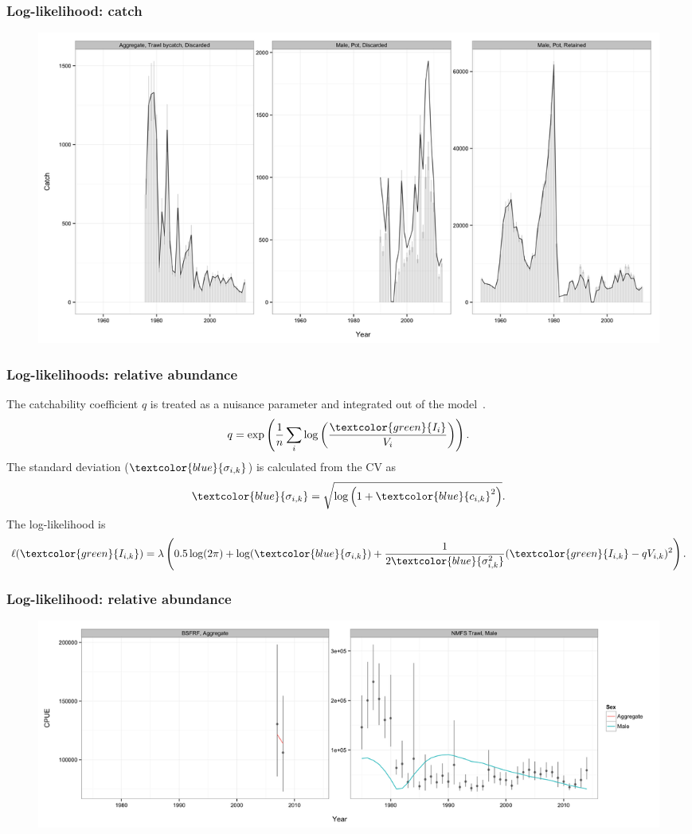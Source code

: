 \documentclass{beamer}
\begin{document}

\begin{frame}
\frametitle{Log-likelihood: catch}
\begin{figure}[!htbp]
  \centering
  \includegraphics[width=0.75\linewidth]{../../examples/bbrkc/OneSex/figure/catch.png}
\end{figure}
\end{frame}


\begin{frame}
\frametitle{Log-likelihoods: relative abundance}
The catchability coefficient $q$ is treated as a nuisance parameter and
integrated out of the model~\citep{Walters1994}.
\begin{equation*}
  q = \exp \left( \frac{1}{n} \sum_i \log \left(
      \frac{\textcolor{green}{I_i}}{V_i} \right) \right).
\end{equation*}
The standard deviation ($\textcolor{blue}{\sigma_{i,k}}$) is calculated from the CV as
\begin{equation*}
  \textcolor{blue}{\sigma_{i,k}} = \sqrt{\log \left(
      1+\textcolor{blue}{c_{i,k}}^2 \right)}.
\end{equation*}
The log-likelihood is
\begin{equation*}
  \ell(\textcolor{green}{I_{i,k}}) = \lambda \left( 0.5 \log (2 \pi) + \log
  (\textcolor{blue}{\sigma_{i,k}}) +
  \frac{1}{2\textcolor{blue}{\sigma^2_{i,k}}} (\textcolor{green}{I_{i,k}} -
  qV_{i,k})^2 \right).
\end{equation*}
\end{frame}


\begin{frame}
\frametitle{Log-likelihood: relative abundance}
\begin{figure}[!htbp]
  \centering
  \includegraphics[width=\linewidth]{../../examples/bbrkc/OneSex/figure/cpue.png}
\end{figure}
\end{frame}
\end{document}
